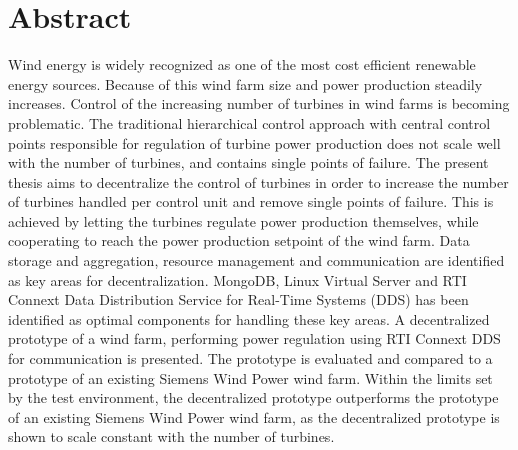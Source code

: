 \chapter{Abstract}
Wind energy is widely recognized as one of the most cost efficient renewable energy sources. 
Because of this wind farm size and power production steadily increases.
Control of the increasing number of turbines in wind farms is becoming problematic.
%
The traditional hierarchical control approach with central control points responsible for regulation of turbine power production does not scale well with the number of turbines, and contains single points of failure.
%
The present thesis aims to decentralize the control of turbines in order to increase the number of turbines handled per control unit and remove single points of failure. 
%
This is achieved by letting the turbines regulate power production themselves, while cooperating to reach the power production setpoint of the wind farm. Data storage and aggregation, resource management and communication are identified as key areas for decentralization.
MongoDB, Linux Virtual Server and RTI Connext Data Distribution Service for Real-Time Systems (DDS) has been identified as optimal components for handling these key areas. 
A decentralized prototype of a wind farm, performing power regulation using RTI Connext DDS for communication is presented.
The prototype is evaluated and compared to a prototype of an existing Siemens Wind Power wind farm. Within the limits set by the test environment, the decentralized prototype outperforms the prototype of an existing Siemens Wind Power wind farm, as the decentralized prototype is shown to scale constant with the number of turbines.

